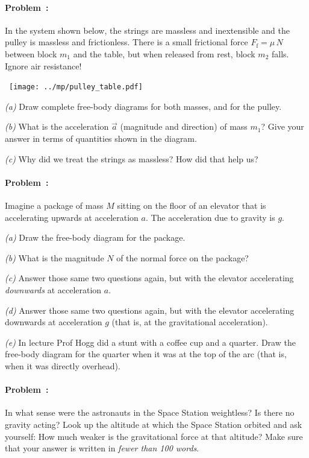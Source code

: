 \documentclass[12pt]{article}
\begin{document}
\paragraph{Problem~\theproblem:}%

In the system shown below, the strings are massless and inextensible
and the pulley is massless and frictionless.  There is a small
frictional force $F_\mathrm{f}=\mu\,N$ between block $m_1$ and the
table, but when released from rest, block $m_2$ falls. Ignore air
resistance!

\noindent~\hfill\texttt{[image: ../mp/pulley\_table.pdf]}\hfill~

\textsl{(a)} Draw complete free-body diagrams for both masses, and for
the pulley.

\textsl{(b)} What is the acceleration $\vec{a}$ (magnitude and
direction) of mass $m_1$?  Give your answer in terms of quantities
shown in the diagram.

\textsl{(c)} Why did we treat the strings as massless? How did that
help us?

\paragraph{Problem~\theproblem:}%
Imagine a package of mass $M$ sitting on the floor of an elevator that
is accelerating upwards at acceleration $a$. The acceleration due to
gravity is $g$.

\textsl{(a)} Draw the free-body diagram for the package.

\textsl{(b)} What is the magnitude $N$ of the normal force on the
package?

\textsl{(c)} Answer those same two questions again, but with the
elevator accelerating \emph{downwards} at acceleration $a$.

\textsl{(d)} Answer those same two questions again, but with the
elevator accelerating downwards at acceleration $g$ (that is, at
the gravitational acceleration).

\textsl{(e)} In lecture Prof Hogg did a stunt with a coffee cup and a
quarter. Draw the free-body diagram for the quarter when it was at the
top of the arc (that is, when it was directly overhead).

\paragraph{Problem~\theproblem:}%
In what sense were the astronauts in the Space Station weightless? Is
there no gravity acting? Look up the altitude at which the Space
Station orbited and ask yourself: How much weaker is the gravitational
force at that altitude? Make sure that your answer is written in \emph{fewer than 100 words}.
\end{document}
